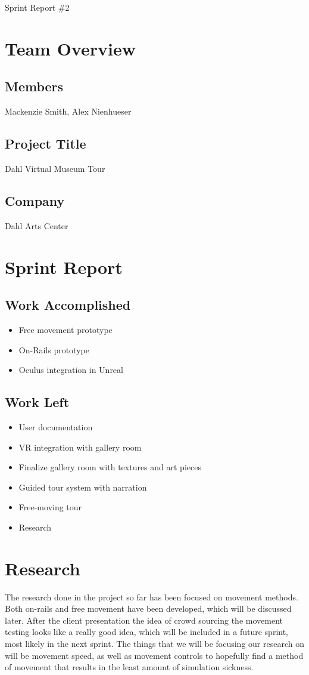 \documentclass[11pt]{book}
\begin{document}
{\fontsize{16}{16}\selectfont Sprint Report \#2}

\section*{Team Overview}
\hrulefill
\subsection*{Members}
Mackenzie Smith, Alex Nienhueser

\subsection*{Project Title}
Dahl Virtual Museum Tour

\subsection*{Company}
Dahl Arts Center


\section*{Sprint Report}
\hrulefill
\subsection*{Work Accomplished}
\begin{itemize}
\item Free movement prototype
\item On-Rails prototype
\item Oculus integration in Unreal

\end{itemize}
\subsection*{Work Left}
\begin{itemize}
\item User documentation
\item VR integration with gallery room
\item Finalize gallery room with textures and art pieces
\item Guided tour system with narration
\item Free-moving tour
\item Research
\end{itemize}

\section*{Research}
The research done in the project so far has been focused on movement methods.  Both on-rails and free movement have been developed, which will be discussed later.  After the client presentation the idea of crowd sourcing the movement testing looks like a really good idea, which will be included in a future sprint, most likely in the next sprint.  The things that we will be focusing our research on will be movement speed, as well as movement controls to hopefully find a method of movement that results in the least amount of simulation sickness.
\end{document}
